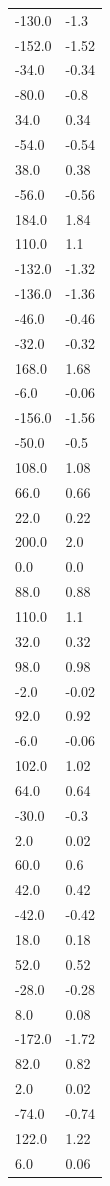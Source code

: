 \begin{longtable}{ll}
-130.0 & -1.3 \\
-152.0 & -1.52 \\
-34.0 & -0.34 \\
-80.0 & -0.8 \\
34.0 & 0.34 \\
-54.0 & -0.54 \\
38.0 & 0.38 \\
-56.0 & -0.56 \\
184.0 & 1.84 \\
110.0 & 1.1 \\
-132.0 & -1.32 \\
-136.0 & -1.36 \\
-46.0 & -0.46 \\
-32.0 & -0.32 \\
168.0 & 1.68 \\
-6.0 & -0.06 \\
-156.0 & -1.56 \\
-50.0 & -0.5 \\
108.0 & 1.08 \\
66.0 & 0.66 \\
22.0 & 0.22 \\
200.0 & 2.0 \\
0.0 & 0.0 \\
88.0 & 0.88 \\
110.0 & 1.1 \\
32.0 & 0.32 \\
98.0 & 0.98 \\
-2.0 & -0.02 \\
92.0 & 0.92 \\
-6.0 & -0.06 \\
102.0 & 1.02 \\
64.0 & 0.64 \\
-30.0 & -0.3 \\
2.0 & 0.02 \\
60.0 & 0.6 \\
42.0 & 0.42 \\
-42.0 & -0.42 \\
18.0 & 0.18 \\
52.0 & 0.52 \\
-28.0 & -0.28 \\
8.0 & 0.08 \\
-172.0 & -1.72 \\
82.0 & 0.82 \\
2.0 & 0.02 \\
-74.0 & -0.74 \\
122.0 & 1.22 \\
6.0 & 0.06 \\

\end{longtable}
